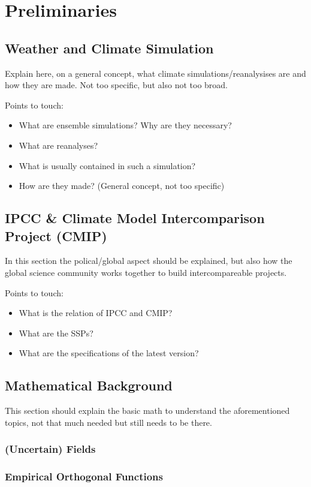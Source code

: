 \chapter{Preliminaries}
\label{ch:preliminaries}

\section{Weather and Climate Simulation}

Explain here, on a general concept, what climate simulations/reanalysises are and how they are made. 
Not too specific, but also not too broad.

Points to touch:
\begin{itemize}
  \item What are ensemble simulations? Why are they necessary?
  \item What are reanalyses?
  \item What is usually contained in such a simulation? 
  \item How are they made? (General concept, not too specific)
  
\end{itemize}



\section{IPCC \& Climate Model Intercomparison Project (CMIP)}

In this section the polical/global aspect should be explained, but also how the global science community works together to build intercompareable projects. \cite{oneill_scenario_2016, riahi_shared_2017, touzepeiffer_coupled_2020}




Points to touch:
\begin{itemize}
  \item What is the relation of IPCC and CMIP?
  \item What are the SSPs?
  \item What are the specifications of the latest version? 
\end{itemize}

\section{Mathematical Background}

This section should explain the basic math to understand the aforementioned topics, not that much needed but still needs to be there.

\subsection{(Uncertain) Fields}

\subsection{Empirical Orthogonal Functions}


